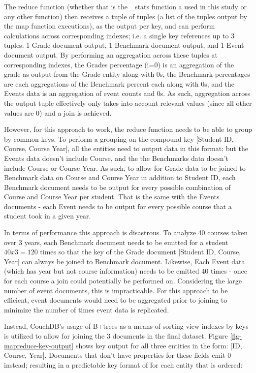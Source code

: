 The reduce function (whether that is the \_stats function a used in this study or any other function) then receives a tuple of tuples (a list of the tuples output by the map function executions), as the output per key, and can perform calculations across corresponding indexes; i.e. a single key references up to 3 tuples: 1 Grade document output, 1 Benchmark document output, and 1 Event document output. By performing an aggregation across these tuples at corresponding indexes, the Grades percentage (i=0) is an aggregation of the grade as output from the Grade entity along with 0s, the Benchmark percentages are each aggregations of the Benchmark percent each along with 0s, and the Events data is an aggregation of event counts and 0s. As such, aggregation across the output tuple effectively only takes into account relevant values (since all other values are 0) and a join is achieved.

However, for this approach to work, the reduce function needs to be able to group by common keys. To perform a grouping on the compound key [Student ID, Course, Course Year], all the entities need to output data in this format; but the Events data doesn't include Course, and the the Benchmarks data doesn't include Course or Course Year. As such, to allow for Grade data to be joined to Benchmark data on Course and Course Year in addition to Student ID, each Benchmark document needs to be output for every possible combination of Course and Course Year per student. That is the same with the Events documents - each Event needs to be output for every possible course that a student took in a given year.

In terms of performance this approach is disastrous. To analyze 40 courses taken over 3 years, each Benchmark document needs to be emitted for a student $40 x 3 = 120$ times so that the key of the Grade document [Student ID, Course, Year] can always be joined to Benchmark document. Likewise, Each Event data (which has year but not course information) needs to be emitted 40 times - once for each course a join could potentially be performed on. Considering the large number of event documents, this is impracticable. For this approach to be efficient, event documents would need to be aggregated prior to joining to minimize the number of times event data is replicated.

Instead, CouchDB's usage of B+trees as a means of sorting view indexes by keys is utilized to allow for joining the 3 documents in the final dataset. Figure \ref{fig-mapreduce-key-output} shows key output for all three entities in the form: [ID, Course, Year]. Documents that don't have properties for these fields emit 0 instead; resulting in a predictable key format of for each entity that is ordered:

